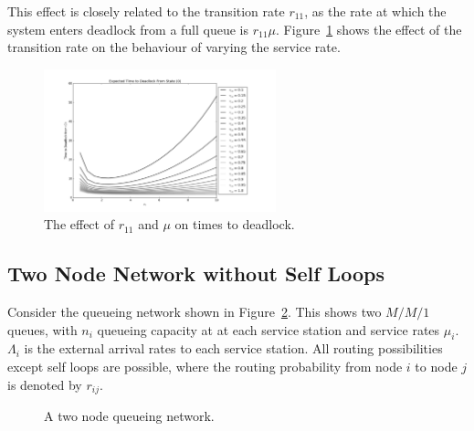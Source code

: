 \documentclass{article}
\begin{document}
This effect is closely related to the transition rate $r_{11}$, as the rate at which the system enters deadlock from a full queue is $r_{11}\mu$.
Figure~\ref{fig:varymuandr} shows the effect of the transition rate on the behaviour of varying the service rate.

\begin{figure}
  \begin{center}
  \includegraphics[width=0.6\textwidth]{images/varymur11}
  \caption{The effect of $r_{11}$ and $\mu$ on times to deadlock.}
  \label{fig:varymuandr}
  \end{center}
\end{figure}

\subsection{Two Node Network without Self Loops}\label{sec:2nodewithoutselfloops}
Consider the queueing network shown in Figure~\ref{fig:queueingnetwork_2nodes}.
This shows two \(M/M/1\) queues, with \(n_i\) queueing capacity at at each service station and service rates $\mu_i$.
$\Lambda_i$ is the external arrival rates to each service station.
All routing possibilities except self loops are possible, where the routing probability from node $i$ to node $j$ is denoted by $r_{ij}$.

\begin{figure}[H]
  
  \caption{A two node queueing network.}
  \label{fig:queueingnetwork_2nodes}
\end{figure}
\end{document}
